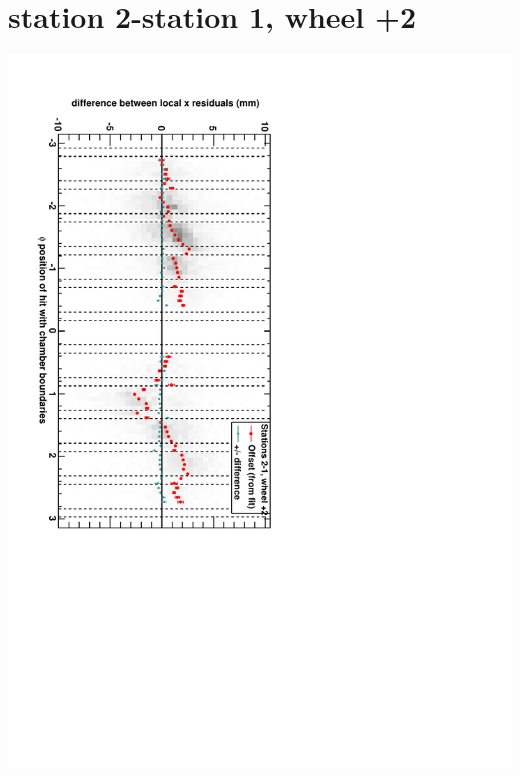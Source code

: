 \documentclass[compress]{beamer}
\begin{document}
\section*{station 2-station 1, wheel +2}
\begin{frame} \vfill \mbox{\hspace{-1 cm}\includegraphics[height=1.2\linewidth, angle=90]{DTrphidiff12VsPhi_whE_slope.pdf}} \end{frame}
\end{document}
